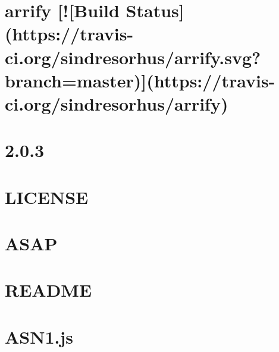 \documentclass[twoside]{book}
\newcommand{\+}{\discretionary{\mbox{\scriptsize$\hookleftarrow$}}{}{}}
\begin{document}
\chapter{arrify \mbox{[}!\mbox{[}Build Status\mbox{]}(https\+://travis-\/ci.org/sindresorhus/arrify.svg?branch=master)\mbox{]}(https\+://travis-\/ci.org/sindresorhus/arrify)}
\label{md__c_1_workspace_demo_src_main_script_node_modules_arrify_readme}

\chapter{2.0.3}
\label{md__c_1_workspace_demo_src_main_script_node_modules_asap__c_h_a_n_g_e_s}

\chapter{L\+I\+C\+E\+N\+SE}
\label{md__c_1_workspace_demo_src_main_script_node_modules_asap__l_i_c_e_n_s_e}

\chapter{A\+S\+AP}
\label{md__c_1_workspace_demo_src_main_script_node_modules_asap__r_e_a_d_m_e}

\chapter{R\+E\+A\+D\+ME}
\label{md__c_1_workspace_demo_src_main_script_node_modules_asn1__r_e_a_d_m_e}

\chapter{A\+S\+N1.\+js}
\label{md__c_1_workspace_demo_src_main_script_node_modules_asn1_8js__r_e_a_d_m_e}

\end{document}
